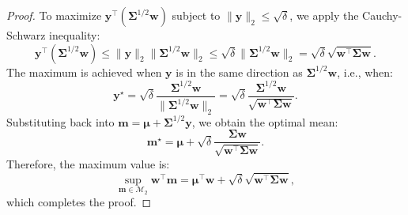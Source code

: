 \documentclass[preprint,12pt,authoryear]{elsarticle}
\begin{document}
\begin{proof}
To maximize $\mathbf{y}^\top (\boldsymbol{\Sigma}^{1/2} \mathbf{w})$ subject to $\|\mathbf{y}\|_2 \leqslant \sqrt{\delta}$, we apply the Cauchy-Schwarz inequality:
\begin{equation}
\mathbf{y}^\top (\boldsymbol{\Sigma}^{1/2} \mathbf{w}) \leqslant \|\mathbf{y}\|_2 \|\boldsymbol{\Sigma}^{1/2} \mathbf{w}\|_2 \leqslant \sqrt{\delta} \|\boldsymbol{\Sigma}^{1/2} \mathbf{w}\|_2 = \sqrt{\delta} \sqrt{\mathbf{w}^\top \boldsymbol{\Sigma} \mathbf{w}}.
\end{equation}
The maximum is achieved when $\mathbf{y}$ is in the same direction as $\boldsymbol{\Sigma}^{1/2} \mathbf{w}$, i.e., when:
\begin{equation}
\mathbf{y}^\star = \sqrt{\delta} \frac{\boldsymbol{\Sigma}^{1/2} \mathbf{w}}{\|\boldsymbol{\Sigma}^{1/2} \mathbf{w}\|_2} = \sqrt{\delta} \frac{\boldsymbol{\Sigma}^{1/2} \mathbf{w}}{\sqrt{\mathbf{w}^\top \boldsymbol{\Sigma} \mathbf{w}}}.
\end{equation}
Substituting back into $\mathbf{m} = \boldsymbol{\mu} + \boldsymbol{\Sigma}^{1/2} \mathbf{y}$, we obtain the optimal mean:
\begin{equation}
\mathbf{m}^\star = \boldsymbol{\mu} + \sqrt{\delta} \frac{\boldsymbol{\Sigma} \mathbf{w}}{\sqrt{\mathbf{w}^\top \boldsymbol{\Sigma} \mathbf{w}}}.
\end{equation}
Therefore, the maximum value is:
\begin{equation}
\sup_{\mathbf{m} \in \mathcal{M}_2} \mathbf{w}^\top \mathbf{m} = \boldsymbol{\mu}^\top \mathbf{w} + \sqrt{\delta} \sqrt{\mathbf{w}^\top \boldsymbol{\Sigma} \mathbf{w}},
\end{equation}
which completes the proof.
\end{proof}
\end{document}
